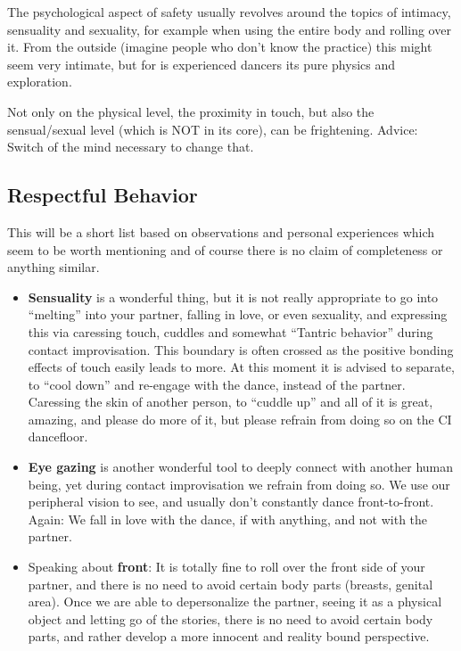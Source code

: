 The psychological aspect of safety usually revolves around the topics of intimacy, sensuality and sexuality,
for example when using the entire body and rolling over it.
From the outside (imagine people who don't know the practice) this might seem very intimate, but for is experienced dancers its pure physics and exploration.

Not only on the physical level, the proximity in touch, but also the sensual/sexual level (which is NOT in its core), can be frightening.
Advice: Switch of the mind necessary to change that.

\subsection{Respectful Behavior}\label{subsec:respectful-behavior}

This will be a short list based on observations and personal experiences which seem to be worth mentioning and of course there is no claim of completeness or anything similar.

\begin{itemize}
    \item \textbf{Sensuality} is a wonderful thing, but it is not really appropriate to go into ``melting'' into your partner, falling in love, or even sexuality, and expressing this via caressing touch, cuddles and somewhat ``Tantric behavior'' during contact improvisation.
    This boundary is often crossed as the positive bonding effects of touch easily leads to more.
    At this moment it is advised to separate, to ``cool down'' and re-engage with the dance, instead of the partner.
    Caressing the skin of another person, to ``cuddle up'' and all of it is great, amazing, and please do more of it, but please refrain from doing so on the CI dancefloor.
    \item \textbf{Eye gazing} is another wonderful tool to deeply connect with another human being, yet during contact improvisation we refrain from doing so.
    We use our peripheral vision to see, and usually don't constantly dance front-to-front.
    Again: We fall in love with the dance, if with anything, and not with the partner.
    \item Speaking about \textbf{front}: It is totally fine to roll over the front side of your partner, and there is no need to avoid certain body parts (breasts, genital area).
    Once we are able to depersonalize the partner, seeing it as a physical object and letting go of the stories, there is no need to avoid certain body parts, and rather develop a more innocent and reality bound perspective.
\end{itemize}

